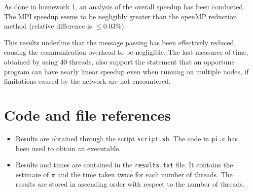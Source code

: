 \documentclass[10pt,a4paper]{article}
\begin{document}
As done in homework 1, an analysis of the overall speedup has been conducted. The MPI speedup seems to be negligibly greater than the openMP reduction method (relative difference is $\leq 0.03\%$).

This results underline that the message passing has been effectively reduced, causing the communication overhead to be negligible. The last measures of time, obtained by using 40 threads, also support the statement that an opportune program can have nearly linear speedup even when running on multiple nodes, if limitations caused by the network are not encountered.

\section*{Code and file references}

\begin{itemize}
	\item Results are obtained through the script \texttt{script.sh}. The code in \texttt{pi.c} has been used to obtain an executable.
	\item Results and times are contained in the \texttt{results.txt} file. It contains the estimate of $\pi$ and the time taken twice for each number of threads. The results are stored in ascending order with respect to the number of threads.
\end{itemize}		
\end{document}
